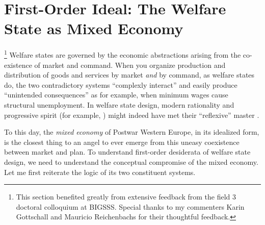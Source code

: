 

\section{First-Order Ideal: The Welfare State as Mixed Economy} \label{sec:mixed-economy}
\footnote{
	This section benefited greatly from extensive feedback from the field 3 doctoral colloquium at \gls{BIGSSS}.
	Special thanks to my commenters Karin Gottschall and Mauricio Reichenbachs for their thoughtful feedback.
}
Welfare states are governed by the economic abstractions arising from the co-existence of market and command.
When you organize production and distribution of goods and services by market \emph{and} by command, as welfare states do, the two contradictory systems ``complexly interact'' \citep{Perrow-1999-aa} and easily produce ``unintended consequences'' \citep{Merton-1936-aa} as for example, when minimum wages cause structural unemployment.
In welfare state design, modern rationality \citep{Weber-1920-aa} and progressive spirit (for example, \citealt{Offe2010}) might indeed have met their ``reflexive'' master \citep{BeckBonss-2003-aa}.

To this day, the \emph{mixed economy} of Postwar Western Europe, in its idealized form, is the closest thing to an angel to ever emerge from this uneasy coexistence between market and plan. To understand first-order desiderata of welfare state design, we need to understand the  conceptual compromise of the mixed economy.
Let me first reiterate the logic of its two constituent systems.


